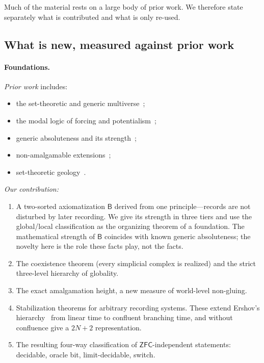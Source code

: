 \documentclass[11pt]{article}
\theoremstyle{definition}
\theoremstyle{remark}
\newcommand{\B}{\mathsf{B}}
\newcommand{\ZFC}{\mathsf{ZFC}}
\begin{document}
Much of the material rests on a large body of prior work. We therefore state separately what is contributed and what is only re-used.

\subsection{What is new, measured against prior work}

\paragraph{Foundations.}
\emph{Prior work} includes:
\begin{itemize}
\item the set-theoretic and generic multiverse~\cite{Hamkins12,Steel04};
\item the modal logic of forcing and potentialism~\cite{HamkinsLowe08,HamkinsLinnebo};
\item generic absoluteness and its strength~\cite{FMW92,Hauser95,Larson04,Wilson17};
\item non-amalgamable extensions~\cite{HHKVW};
\item set-theoretic geology~\cite{FHR15}.
\end{itemize}

\noindent \emph{Our contribution:}
\begin{enumerate}
\item A two-sorted axiomatization $\B$ derived from one principle---records are not disturbed by later recording. We give its strength in three tiers and use the global/local classification as the organizing theorem of a foundation. The mathematical strength of $\B$ coincides with known generic absoluteness; the novelty here is the role these facts play, not the facts.
\item The coexistence theorem (every simplicial complex is realized) and the strict three-level hierarchy of globality.
\item The exact amalgamation height, a new measure of world-level non-gluing.
\item Stabilization theorems for arbitrary recording systems. These extend Ershov's hierarchy~\cite{Ershov68} from linear time to confluent branching time, and without confluence give a $2N+2$ representation.
\item The resulting four-way classification of $\ZFC$-independent statements: decidable, oracle bit, limit-decidable, switch.
\end{enumerate}
\end{document}
